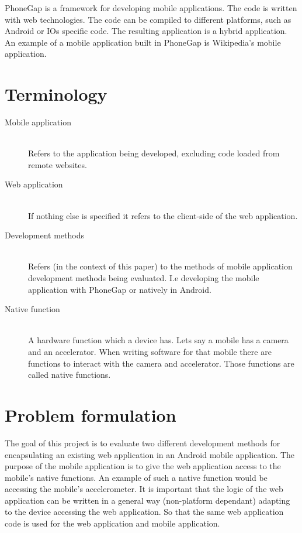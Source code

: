 PhoneGap is a framework for developing mobile applications. The code is written with web technologies. The code can be compiled to different platforms, such as Android or IOs specific code. The resulting application is a hybrid application. An example of a mobile application built in PhoneGap is Wikipedia's mobile application.  

\section{Terminology}
\begin{description}
  \item[Mobile application] \hfill \\
    Refers to the application being developed, excluding code loaded from remote websites.
  \item[Web application] \hfill \\
    If nothing else is specified it refers to the client-side of the web application.
  \item[Development methods] \hfill \\
    Refers (in the context of this paper) to the methods of mobile application development methods being evaluated. I.e developing the mobile application with PhoneGap or natively in Android.
  \item[Native function] \hfill \\
     A hardware function which a device has. Lets say a mobile has a camera and an accelerator. When writing software for that mobile there are functions to interact with the camera and accelerator. Those functions are called native functions.
\end{description}

\section{Problem formulation}
The goal of this project is to evaluate two different development methods for encapsulating an existing web application in an Android mobile application. The purpose of the mobile application is to give the web application access to the mobile's native functions. An example of such a native function would be accessing the mobile's accelerometer. It is important that the logic of the web application can be written in a general way (non-platform dependant) adapting to the device accessing the web application. So that the same web application code is used for the web application and mobile application.

